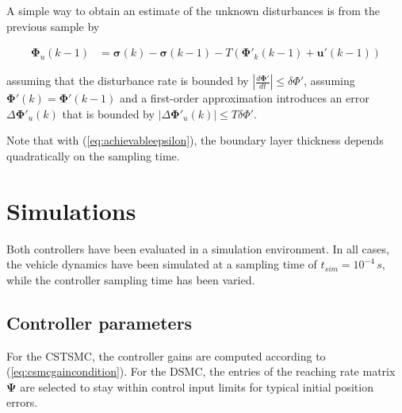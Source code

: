 \documentclass{ifacconf}
\providecommand{\mbf}[1]{\mathbf{#1}}
\begin{document}
%
%
%



A simple way to obtain an estimate of the unknown disturbances is from the previous sample by

\begin{align}
\mbf{\Phi}_u(k-1) &=
\mbf{\sigma}(k)
-
\mbf{\sigma}(k-1)
-
T
(\mbf{\Phi}'_k(k-1) + \mbf{u}'(k-1))
\end{align}

assuming that the disturbance rate is bounded by $|\frac{d \mbf{\Phi}'}{dt}| \leq \delta \Phi'$, assuming $\mbf{\Phi}'(k) = \mbf{\Phi}'(k-1)$ and a first-order approximation introduces an error $\Delta \mbf{\Phi}'_u(k)$ that is bounded by $|\Delta \mbf{\Phi}'_u(k)| \leq T \delta \Phi' $.

Note that with (\ref{eq:achievableepsilon}), the boundary layer thickness depends quadratically on the sampling time.

\section{Simulations}

Both controllers have been evaluated in a simulation environment. In all cases, the vehicle dynamics have been simulated at a sampling time of $t_{sim} = 10^{-4} \, s$, while the controller sampling time has been varied.

\subsection{Controller parameters}

For the CSTSMC, the controller gains are computed according to (\ref{eq:csmcgaincondition}). For the DSMC, the entries of the reaching rate matrix $\mbf{\Psi}$ are selected to stay within control input limits for typical initial position errors.
\end{document}
